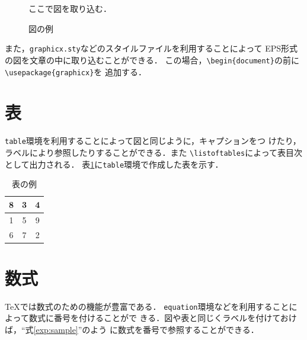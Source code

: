 \documentclass[11pt]{jreport}
\begin{document}
\begin{figure}
  \begin{center}
     ここで図を取り込む．



  \end{center}
  \caption{図の例}
  \label{fig:sample}

\end{figure}

また，{\tt graphicx.sty}などのスタイルファイルを利用することによって
EPS形式の図を文章の中に取り込むことができる．
この場合，\verb|\begin{document}|の前に\verb|\usepackage{graphicx}|を
追加する．

\section{表}

{\tt table}環境を利用することによって図と同じように，キャプションをつ
けたり，ラベルにより参照したりすることができる．また
\verb|\listoftables|によって表目次として出力される．
表\ref{tab:sample}に{\tt table}環境で作成した表を示す．

\begin{table}
  \caption{表の例}
  \label{tab:sample}
  \begin{center}
    \begin{tabular}{|c|c|c|}
      \hline
      8 & 3 & 4\\
      \hline
      1 & 5 & 9 \\
      \hline
      6 & 7 & 2 \\
      \hline
    \end{tabular}
  \end{center}
\end{table}

\section{数式}

\TeX では数式のための機能が豊富である．
{\tt equation}環境などを利用することによって数式に番号を付けることがで
きる．図や表と同じくラベルを付けておけば，``式\ref{exp:sample}''のよう
に数式を番号で参照することができる．
\end{document}
